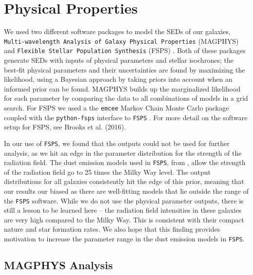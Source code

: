 \documentclass[preprint,natbib209]{aastex}
\begin{document}
\section{Physical Properties}
\label{sec:analysis}


We used two different software packages to model the SEDs of our galaxies, \texttt{Multi-wavelength Analysis of Galaxy Physical Properties} (MAGPHYS) \citep{dacunha08, dacunha15} and \texttt{Flexible Stellar Population Synthesis} (FSPS) \citep{conroy09, conroy10}. Both of these packages generate SEDs with inputs of physical parameters and stellar isochrones; the best-fit physical parameters and their uncertainties are found by maximizing the likelihood, using a Bayesian approach by taking priors into account when an informed prior can be found. MAGPHYS builds up the marginalized likelihood for each parameter by comparing the data to all combinations of models in a grid search. For FSPS we used a the \texttt{emcee} Markov Chain Monte Carlo package \citep{emcee} coupled with the \texttt{python-fsps} interface to \texttt{FSPS} \citep{python-fsps}. For more detail on the software setup for FSPS, see Brooks et al. (2016). 

In our use of \texttt{FSPS}, we found that the outputs could not be used for further analysis, as we hit an edge in the parameter distribution for the strength of the radiation field. The dust emission models used in \texttt{FSPS}, from \cite{draine07}, allow the strength of the radiation field go to 25 times the Milky Way level. The output distributions for all galaxies consistently hit the edge of this prior, meaning that our results our biased as there are well-fitting models that lie outside the range of the \texttt{FSPS} software. While we do not use the physical parameter outputs, there is still a lesson to be learned here -- the radiation field intensities in these galaxies are very high compared to the Milky Way. This is consistent with their compact nature and star formation rates. We also hope that this finding provides motivation to increase the parameter range in the dust emission models in \texttt{FSPS}.

\subsection{MAGPHYS Analysis}
\end{document}
